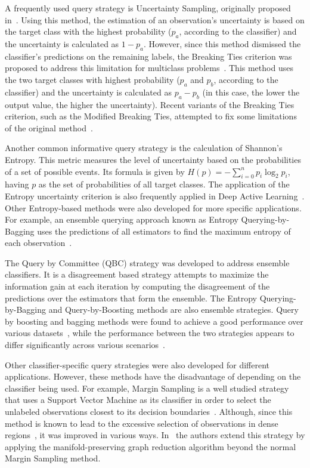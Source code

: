 \documentclass[preprint, 12pt]{elsarticle}
\begin{document}
A frequently used query strategy is Uncertainty Sampling, originally proposed
in~\cite{Lewis1994}. Using this method, the estimation of an observation's
uncertainty is based on the target class with the highest probability ($p_a$,
according to the classifier) and the uncertainty is calculated as $1-p_a$.
However, since this method dismissed the classifier's predictions on the
remaining labels, the Breaking Ties criterion was proposed to address this
limitation for multiclass problems~\cite{Luo2005}. This method uses the two
target classes with highest probability ($p_a$ and $p_b$, according to the
classifier) and the uncertainty is calculated as $p_a - p_b$ (in this case,
the lower the output value, the higher the uncertainty). Recent variants of
the Breaking Ties criterion, such as the Modified Breaking Ties, attempted to
fix some limitations of the original method~\cite{Liu2018, Li2012a}.

Another common informative query strategy is the calculation of Shannon's
Entropy. This metric measures the level of uncertainty
based on the probabilities of a set of possible events. Its formula is given
by $H(p)=-\sum_{i=0}^n{p_i\log_2{p_i}}$, having $p$ as the set of
probabilities of all target classes. The application of the Entropy
uncertainty criterion is also frequently applied in Deep Active
Learning~\cite{Aghdam2019}. Other Entropy-based methods were also developed
for more specific applications. For example, an ensemble querying approach
known as Entropy Querying-by-Bagging uses the predictions of all estimators to
find the maximum entropy of each observation~\cite{Abe1998}.

The Query by Committee (QBC) strategy was developed to address ensemble
classifiers. It is a disagreement based strategy attempts to maximize the
information gain at each iteration by computing the disagreement of the
predictions over the estimators that form the ensemble. The Entropy
Querying-by-Bagging and Query-by-Boosting methods are also ensemble
strategies. Query by boosting and bagging methods were found to achieve a good
performance over various datasets~\cite{Melville2004}, while the performance
between the two strategies appears to differ significantly across various
scenarios~\cite{Bloodgood2018}.

Other classifier-specific query strategies were also developed for different
applications. However, these methods have the disadvantage of depending on the
classifier being used. For example, Margin Sampling is a well studied strategy
that uses a Support Vector Machine as its classifier in order to select the
unlabeled observations closest to its decision boundaries~\cite{Kumar2020}.
Although, since this method is known to lead to the excessive selection of
observations in dense regions~\cite{Zhou2014}, it was improved in various
ways. In~\cite{Zhou2014} the authors extend this strategy by applying the
manifold-preserving graph reduction algorithm beyond the normal Margin
Sampling method.
 
\end{document}
